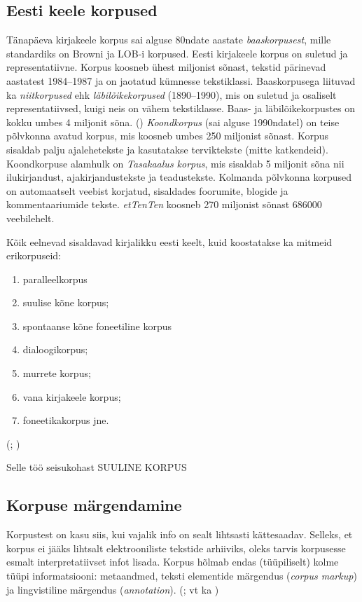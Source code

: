 \documentclass[12pt]{article}
\begin{document}
\subsection{Eesti keele korpused}

Tänapäeva kirjakeele korpus sai alguse 80ndate aastate \emph{baaskorpusest}, mille standardiks on Browni ja LOB-i korpused. Eesti kirjakeele korpus on suletud ja representatiivne. Korpus koosneb ühest miljonist sõnast, tekstid pärinevad aastatest 1984--1987 ja on jaotatud kümnesse tekstiklassi. Baaskorpusega liituvad ka \emph{niitkorpused} ehk \emph{läbilõikekorpused} (1890--1990), mis on suletud ja osaliselt representatiivsed, kuigi neis on vähem tekstiklasse. Baas- ja läbilõikekorpustes on kokku umbes 4 miljonit sõna. (\citealp[14--15]{KR}) \emph{Koondkorpus} (sai alguse 1990ndatel) on teise põlvkonna avatud korpus, mis koosneb umbes 250 miljonist sõnast. Korpus sisaldab palju ajalehetekste ja kasutatakse terviktekste (mitte katkendeid). Koondkorpuse alamhulk on \emph{Tasakaalus korpus}, mis sisaldab 5 miljonit sõna nii ilukirjandust, ajakirjandustekste ja teadustekste. Kolmanda põlvkonna korpused on automaatselt veebist korjatud, sisaldades foorumite, blogide ja kommentaariumide tekste. \citep[38]{M_OK2015} \emph{etTenTen} koosneb 270 miljonist sõnast 686000 veebilehelt. \citep{eTenTen}

Kõik eelnevad sisaldavad kirjalikku eesti keelt, kuid koostatakse ka mitmeid erikorpuseid:

\begin{enumerate}
    \item paralleelkorpus
    \item suulise kõne korpus;
    \item spontaanse kõne foneetiline korpus
    \item dialoogikorpus;
    \item murrete korpus;
    \item vana kirjakeele korpus;
    \item foneetikakorpus jne.
\end{enumerate}
(\citealp{Keelekogu}; \citealp[17--22]{KR})

Selle töö seisukohast SUULINE KORPUS

\subsection{Korpuse märgendamine}

Korpustest on kasu siis, kui vajalik info on sealt lihtsasti kättesaadav. Selleks, et korpus ei jääks lihtsalt elektrooniliste tekstide arhiiviks, oleks tarvis korpusesse esmalt interpretatiivset infot lisada. \citep[12]{KR} Korpus hõlmab endas (tüüpiliselt) kolme tüüpi informatsiooni: metaandmed, teksti elementide märgendus (\emph{corpus markup}) ja lingvistiline märgendus (\emph{annotation}). (\citealp[30]{KORPUS}; vt ka \citealp{BURNARD})
\end{document}
